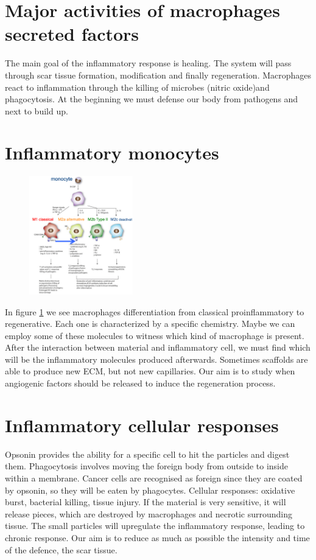 \section{Major activities of macrophages secreted factors}
The main goal of the inflammatory response is healing. 
The system will pass through scar tissue formation, modification and finally regeneration. Macrophages react to inflammation through the killing of microbes (nitric oxide)and phagocytosis. 
At the beginning we must defense our body from pathogens and next to build up.

\section{Inflammatory monocytes}
\begin{figure}[ht]
\centering
\includegraphics[width=0.4\textwidth]{mono_diff}
\caption{\label{fig:mono}}
\end{figure}

\noindent
In figure \ref{fig:mono} we see macrophages differentiation from classical proinflammatory to regenerative. 
Each one is characterized by a specific chemistry. 
Maybe we can employ some of these molecules to witness which kind of macrophage is present. After the interaction between material and inflammatory cell, we must find which will be the inflammatory molecules produced afterwards. 
Sometimes scaffolds are able to produce new ECM, but not new capillaries. 
Our aim is to study when angiogenic factors should be released to induce the regeneration process. 
 
\section{Inflammatory cellular responses}
Opsonin provides the ability for a specific cell to hit the particles and digest them. Phagocytosis involves moving the foreign body from outside to inside within a membrane.
Cancer cells are recognised as foreign since they are coated by opsonin, so they will be eaten by phagocytes.  
Cellular responses: oxidative burst, bacterial killing, tissue injury. 
If the material is very sensitive, it will release pieces, which are destroyed by macrophages and necrotic surrounding tissue. 
The small particles will upregulate the inflammatory response, leading to chronic response. 
Our aim is to reduce as much as possible the intensity and time of the defence, the scar tissue.

